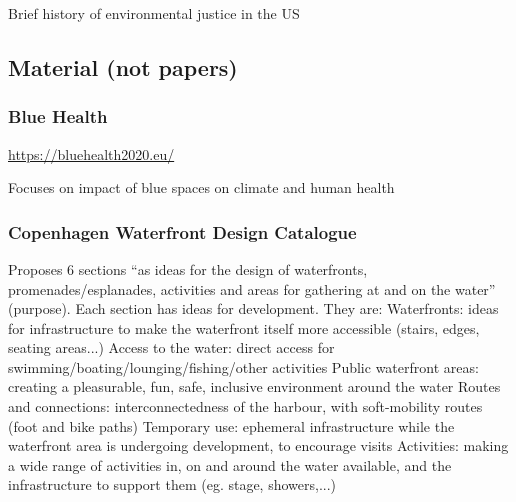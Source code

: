 \documentclass{article}
\begin{document}
\subsubsection{}

\begin{outline}
	\1 Brief history of environmental justice in the US
\end{outline}


\subsection{Material (not papers)}

\subsubsection{Blue Health}

\url{https://bluehealth2020.eu/}

\begin{outline}
	\1 Focuses on impact of blue spaces on climate and human health
\end{outline}

\subsubsection{Copenhagen Waterfront Design Catalogue}

\parencite{copenhagenwaterfront}

\begin{outline}
	\1 Proposes 6 sections ``as ideas for the design of waterfronts, promenades/esplanades, activities and areas for gathering at and on the water'' (purpose). Each section has ideas for development. They are:
		\2 Waterfronts: ideas for infrastructure to make the waterfront itself more accessible (stairs, edges, seating areas...)
		\2 Access to the water: direct access for swimming/boating/lounging/fishing/other activities
		\2 Public waterfront areas: creating a pleasurable, fun, safe, inclusive environment around the water
		\2 Routes and connections: interconnectedness of the harbour, with soft-mobility routes (foot and bike paths)
		\2 Temporary use: ephemeral infrastructure while the waterfront area is undergoing development, to encourage visits
		\2 Activities: making a wide range of activities in, on and around the water available, and the infrastructure to support them (eg. stage, showers,...)
\end{outline}


\printbibliography
\end{document}
